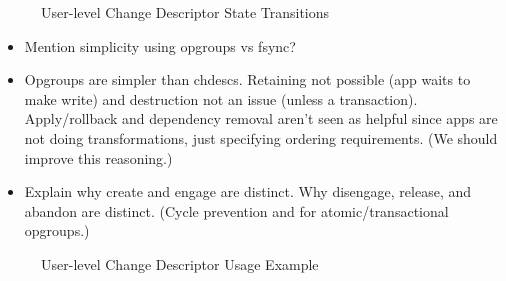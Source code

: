 \begin{figure}[htb]
\caption{\label{fig:opgroup-transitions} User-level Change Descriptor State Transitions}
\end{figure}

\begin{itemize}
\item Mention simplicity using opgroups vs fsync?
\item Opgroups are simpler than chdescs. Retaining not possible (app
  waits to make write) and destruction not an issue (unless a
  transaction). Apply/rollback and dependency removal aren't seen as
  helpful since apps are not doing transformations, just specifying
  ordering requirements. (We should improve this reasoning.)
\item Explain why create and engage are distinct. Why disengage,
  release, and abandon are distinct. (Cycle prevention and for
  atomic/transactional opgroups.)
\end{itemize}


\begin{figure}[htb]
\vspace{-10pt}
\vspace{-10pt}
\caption{\label{fig:opgroup-example} User-level Change Descriptor Usage Example}
\end{figure}

